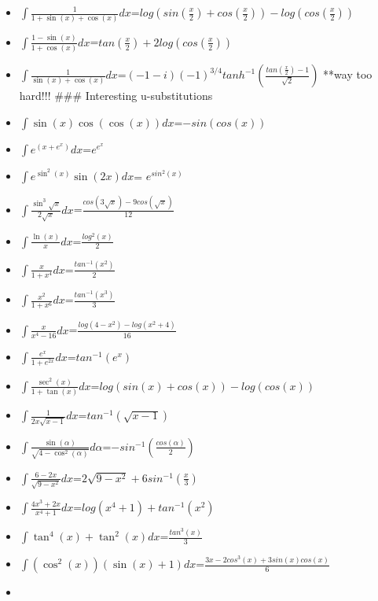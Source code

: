 \begin{itemize}
\tightlist
\item
  \(\displaystyle\int \frac{1}{1 + \sin(x) + \cos(x)}dx\)=\(log(sin(\frac{x}{2})+cos(\frac{x}{2}))-log(cos(\frac{x}{2}))\)
\item
  \(\displaystyle\int \frac{1-\sin(x)}{1 + \cos(x)}dx\)=\(tan(\frac{x}{2})+2log(cos(\frac{x}{2}))\)
\item
  \(\displaystyle\int \frac{1}{\sin(x) + \cos(x)}dx\)=\((-1-i)(-1)^{3/4}tanh^{-1}(\frac{tan(\frac{x}{2})-1}{\sqrt{2}})\)
  **way too hard!!! \#\#\# Interesting u-substitutions
\item
  \(\displaystyle\int \sin(x)\cos(\cos(x)) dx\)=\(-sin(cos(x))\)
\item
  \(\displaystyle\int e^{(x+e^x)} dx\)=\(e^{e^{x}}\)
\item
  \(\displaystyle\int e^{\sin^2(x)}\sin(2x)dx\)= \(e^{sin^2(x)}\)
\item
  \(\displaystyle\int \frac{\sin^3{\sqrt{x}}}{2\sqrt{x}}dx\)=\(\frac{cos(3\sqrt{x})-9cos(\sqrt{x})}{12}\)
\item
  \(\displaystyle\int \frac{\ln(x)}{x}dx\)=\(\frac{log^2(x)}{2}\)
\item
  \(\displaystyle\int \frac{x}{1+x^4}dx\)=\(\frac{tan^{-1}(x^2)}{2}\)
\item
  \(\displaystyle\int \frac{x^2}{1+x^6}dx\)=\(\frac{tan^{-1}(x^3)}{3}\)
\item
  \(\displaystyle\int \frac{x}{x^4-16}dx\)=\(\frac{log(4-x^2)-log(x^2+4)}{16}\)
\item
  \(\displaystyle\int \frac{e^x}{1+e^{2x}}dx\)=\(tan^{-1}(e^x)\)
\item
  \(\displaystyle\int \frac{\sec^2(x)}{1+\tan(x)}dx\)=\(log(sin(x)+cos(x))-log(cos(x))\)
\item
  \(\displaystyle\int \frac{1}{2x\sqrt{x-1}}dx\)=\(tan^{-1}(\sqrt{x-1})\)
\item
  \(\displaystyle\int \frac{\sin(\alpha)}{\sqrt{4-\cos^2(\alpha)}}d\alpha\)=\(-sin^{-1}(\frac{cos(\alpha)}{2})\)
\item
  \(\displaystyle\int \frac{6-2x}{\sqrt{9-x^2}}dx\)=\(2\sqrt{9-x^2}+6sin^{-1}(\frac{x}{3})\)
\item
  \(\displaystyle\int \frac{4x^3+2x}{x^4+1}dx\)=\(log(x^4+1)+tan^{-1}(x^2)\)
\item
  \(\displaystyle\int \tan^4(x) + \tan^2(x)dx\)=\(\frac{tan^3(x)}{3}\)
\item
  \(\displaystyle\int (\cos^2(x))(\sin(x) + 1)dx\)=\(\frac{3x-2cos^3(x)+3sin(x)cos(x)}{6}\)
\item

\end{itemize}
